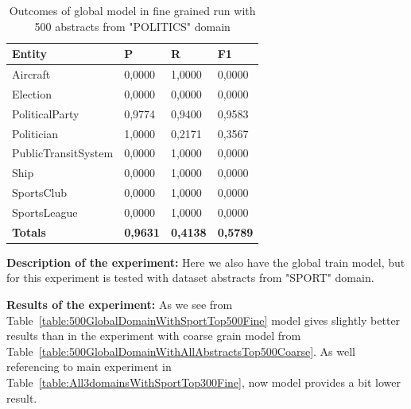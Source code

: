\documentclass[thesis=M,english]{FITthesis}[2018/05/30]
\begin{document}
	\begin{table}[H]\centering
		\begin{tabular}{|l|l|l|l|}
			\hline {\textbf{Entity}} & {\textbf{P}} & {\textbf{R}} & {\textbf{F1}}\\\hline
				Aircraft & 0,0000 & 1,0000 & 0,0000\\				
				Election & 0,0000 & 0,0000 & 0,0000\\
				PoliticalParty & 0,9774 & 0,9400 & 0,9583\\
				Politician & 1,0000 & 0,2171 & 0,3567\\
				PublicTransitSystem & 0,0000 & 1,0000 & 0,0000\\
				Ship & 0,0000 & 1,0000 & 0,0000\\
				SportsClub & 0,0000 & 1,0000 & 0,0000\\
				SportsLeague & 0,0000 & 1,0000 & 0,0000\\\hline
				\textbf{Totals} & \textbf{0,9631} & \textbf{0,4138} & \textbf{0,5789}\\\hline
		\end{tabular}
		\caption{Outcomes of global model in fine grained run with 500 abstracts from "POLITICS" domain \label{table:500GlobalDomainWithPoliticsTop500Fine}}
	\end{table}	

	\textbf{Description of the experiment:} Here we also have the global train model, but for this experiment is tested with dataset abstracts from "SPORT" domain.

	\textbf{Results of the experiment:} As we see from Table~\ref{table:500GlobalDomainWithSportTop500Fine} model gives slightly better results than in the experiment with coarse grain model from Table~\ref{table:500GlobalDomainWithAllAbstractsTop500Coarse}. As well referencing to main experiment in Table~\ref{table:All3domainsWithSportTop300Fine}, now model provides a bit lower result.
\end{document}
